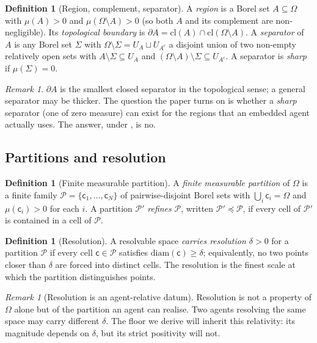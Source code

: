 \documentclass[11pt,twocolumn,a4paper]{article}
\theoremstyle{thmstyle}
\theoremstyle{definition}
\newtheorem{definition}[theorem]{Definition}
\theoremstyle{remark}
\newtheorem{remark}[theorem]{Remark}
\newcommand{\Space}{\Omega}
\newcommand{\Bdy}{\partial}
\newcommand{\cl}{\mathrm{cl}}
\newcommand{\diam}{\mathrm{diam}}
\newcommand{\reso}{\delta}
\newcommand{\Part}{\mathscr{P}}
\newcommand{\cell}{\mathsf{c}}
\begin{document}
\begin{definition}[Region, complement, separator]
\label{def:region}
A \emph{region} is a Borel set $A\subseteq\Space$ with
$\mu(A)>0$ and $\mu(\Space\setminus A)>0$ (so both $A$ and its complement are
non-negligible). Its \emph{topological boundary} is
$\Bdy A=\cl(A)\cap\cl(\Space\setminus A)$. A \emph{separator} of $A$ is any
Borel set $\Sigma$ with $\Space\setminus\Sigma=U_A\sqcup U_{A^c}$ a disjoint
union of two non-empty relatively open sets with $A\setminus\Sigma\subseteq
U_A$ and $(\Space\setminus A)\setminus\Sigma\subseteq U_{A^c}$. A separator is
\emph{sharp} if $\mu(\Sigma)=0$.
\end{definition}

\begin{remark}
$\Bdy A$ is the smallest closed separator in the topological sense; a general
separator may be thicker. The question the paper turns on is whether a
\emph{sharp} separator (one of zero measure) can exist for the regions that an
embedded agent actually uses. The answer, under , is no.
\end{remark}

\subsection{Partitions and resolution}

\begin{definition}[Finite measurable partition]
\label{def:partition}
A \emph{finite measurable partition} of $\Space$ is a finite family
$\Part=\{\cell_1,\dots,\cell_N\}$ of pairwise-disjoint Borel sets with
$\bigcup_i\cell_i=\Space$ and $\mu(\cell_i)>0$ for each $i$. A partition
$\Part'$ \emph{refines} $\Part$, written $\Part'\preceq\Part$, if every cell of
$\Part'$ is contained in a cell of $\Part$.
\end{definition}

\begin{definition}[Resolution]
\label{def:resolution}
A resolvable space \emph{carries resolution $\reso>0$} for a partition $\Part$
if every cell $\cell\in\Part$ satisfies $\diam(\cell)\ge\reso$; equivalently, no
two points closer than $\reso$ are forced into distinct cells. The resolution
is the finest scale at which the partition distinguishes points.
\end{definition}

\begin{remark}[Resolution is an agent-relative datum]
\label{rem:reso-relative}
Resolution is not a property of $\Space$ alone but of the partition an agent can
realise. Two agents resolving the same space may carry different $\reso$. The
floor we derive will inherit this relativity: its magnitude depends on $\reso$,
but its strict positivity will not.
\end{remark}
\end{document}
